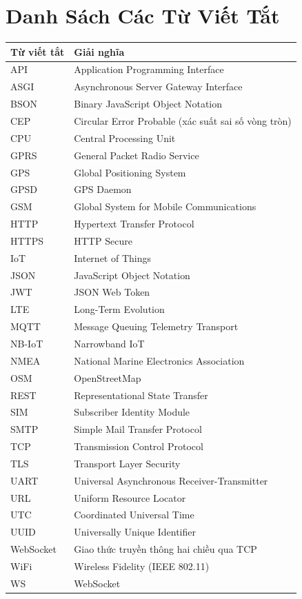 \chapter{Danh Sách Các Từ Viết Tắt}

\begin{table}[H]
\centering
\begin{tabularx}{\textwidth}{l X}
\toprule
\textbf{Từ viết tắt} & \textbf{Giải nghĩa} \\
\midrule
API    & Application Programming Interface \\
ASGI   & Asynchronous Server Gateway Interface \\
BSON   & Binary JavaScript Object Notation \\
CEP    & Circular Error Probable (xác suất sai số vòng tròn) \\
CPU    & Central Processing Unit \\
GPRS   & General Packet Radio Service \\
GPS    & Global Positioning System \\
GPSD   & GPS Daemon \\
GSM    & Global System for Mobile Communications \\
HTTP   & Hypertext Transfer Protocol \\
HTTPS  & HTTP Secure \\
IoT    & Internet of Things \\
JSON   & JavaScript Object Notation \\
JWT    & JSON Web Token \\
LTE    & Long-Term Evolution \\
MQTT   & Message Queuing Telemetry Transport \\
NB-IoT & Narrowband IoT \\
NMEA   & National Marine Electronics Association \\
OSM    & OpenStreetMap \\
REST   & Representational State Transfer \\
SIM    & Subscriber Identity Module \\
SMTP   & Simple Mail Transfer Protocol \\
TCP    & Transmission Control Protocol \\
TLS    & Transport Layer Security \\
UART   & Universal Asynchronous Receiver-Transmitter \\
URL    & Uniform Resource Locator \\
UTC    & Coordinated Universal Time \\
UUID   & Universally Unique Identifier \\
WebSocket & Giao thức truyền thông hai chiều qua TCP \\
WiFi   & Wireless Fidelity (IEEE 802.11) \\
WS     & WebSocket \\
\bottomrule
\end{tabularx}
\end{table}
